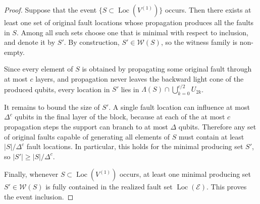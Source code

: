 \begin{proof}
  Suppose that the event $\{S\subset \operatorname{Loc}(V^{(1)})\}$ occurs. Then there exists at least one set of original fault locations whose propagation produces all the faults in $S$. Among all such sets choose one that is minimal with respect to inclusion, and denote it by $S'$. By construction, $S'\in \mathcal{W}(S)$, so the witness family is non-empty.

  Since every element of $S$ is obtained by propagating some original fault through at most $c$ layers, and propagation never leaves the backward light cone of the produced qubits, every location in $S'$ lies in $\Lambda(S)\cap \bigcup_{k=0}^{c/2}U_{2k}$.

  It remains to bound the size of $S'$. A single fault location can influence at most $\Delta^{c}$ qubits in the final layer of the block, because at each of the at most $c$ propagation steps the support can branch to at most $\Delta$ qubits. Therefore any set of original faults capable of generating all elements of $S$ must contain at least $|S|/\Delta^{c}$ fault locations. In particular, this holds for the minimal producing set $S'$, so $|S'|\ge |S|/\Delta^{c}$.

  Finally, whenever $S\subset \operatorname{Loc}(V^{(1)})$ occurs, at least one minimal producing set $S'\in \mathcal{W}(S)$ is fully contained in the realized fault set $\operatorname{Loc}(\mathcal{E})$. This proves the event inclusion.
\end{proof}

